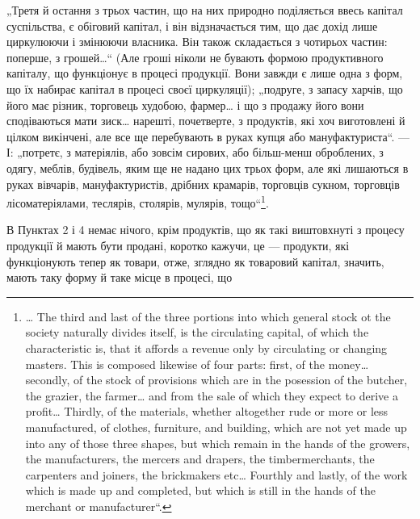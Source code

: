 „Третя й остання з трьох частин, що на них природно поділяється
ввесь капітал суспільства, є обіговий капітал, і він відзначається тим, що
дає дохід лише циркулюючи і змінюючи власника. Він також складається
з чотирьох частин: поперше, з грошей\dots{}“ (Але гроші ніколи не
бувають формою продуктивного капіталу, що функціонує в процесі продукції.
Вони завжди є лише одна з форм, що їх набирає капітал в процесі
своєї циркуляції); „подруге, з запасу харчів, що його має різник,
торговець худобою, фармер\dots{} і що з продажу його вони сподіваються
мати зиск\dots{} нарешті, почетверте, з продуктів, які хоч виготовлені й цілком
викінчені, але все ще перебувають в руках купця або мануфактуриста“.
— І: „потретє, з матеріялів, або зовсім сирових, або більш-менш
оброблених, з одягу, меблів, будівель, яким ще не надано цих трьох
форм, але які лишаються в руках вівчарів, мануфактуристів, дрібних
крамарів, торговців сукном, торговців лісоматеріялами, теслярів, столярів,
мулярів, тощо“\footnote*{
\dots{} The third and last of the three portions into which general stock ot the
society naturally divides itself, is the circulating capital, of which the characteristic
is, that it affords a revenue only by circulating or changing masters. This is
composed likewise of four parts: first, of the money\dots{} secondly, of the stock of
provisions which are in the posession of the butcher, the grazier, the farmer\dots{} and
from the sale of which they expect to derive a profit\dots{} Thirdly, of the materials,
whether altogether rude or more or less manufactured, of clothes, furniture, and
building, which are not yet made up into any of those three shapes, but which remain
in the hands of the growers, the manufacturers, the mercers and drapers, the timbermerchants, the
carpenters and joiners, the brickmakers etc\dots{} Fourthly and lastly, of
the work which is made up and completed, but which is still in the hands of the
merchant or manufacturer“.
}.

В Пунктах 2 і 4 немає нічого, крім продуктів, що як такі виштовхнуті
з процесу продукції й мають бути продані, коротко кажучи,
це — продукти, які функціонують тепер як товари, отже, зглядно як товаровий
капітал, значить, мають таку форму й таке місце в процесі, що
\parbreak{}  %
